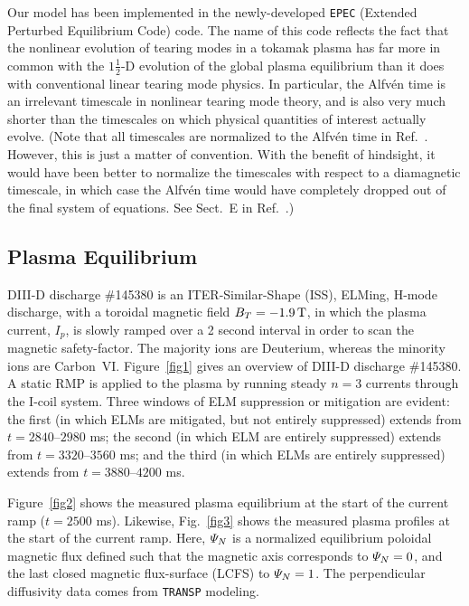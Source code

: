 \documentclass[12pt,prb,aps]{revtex4-1}
\begin{document}
Our model has been implemented in the newly-developed {\tt EPEC} (Extended Perturbed Equilibrium Code) code. The name
of this code reflects the fact that the nonlinear evolution of tearing modes in a
tokamak plasma has far more in common with the $1\tfrac{1}{2}$-D
evolution of the global plasma equilibrium than it does with
conventional linear tearing mode physics. In particular, the Alfv\'{e}n time is
an irrelevant  timescale in nonlinear tearing mode theory, and
is also  very much shorter than the timescales on which
physical quantities of interest actually evolve. (Note that all timescales are normalized to the Alfv\'{e}n time
in Ref.~. However, this is just a matter of convention. With the benefit of hindsight, it would
have been better to normalize the timescales with respect to a diamagnetic timescale, in which case the Alfv\'{e}n time would have completely dropped
out of the final system of equations. See Sect.~E in Ref.~.)

\subsection{Plasma Equilibrium}
DIII-D discharge \#145380 is an ITER-Similar-Shape (ISS), ELMing, H-mode discharge, with a toroidal magnetic field $B_T=-1.9\,{\rm T}$, in which the
plasma current, $I_p$, is slowly ramped over a 2 second interval in order to scan the magnetic safety-factor.\cite{d3d,d3d2} The majority ions are Deuterium, whereas the
minority ions are Carbon~VI.
Figure~\ref{fig1} gives an overview of DIII-D discharge \#145380. 
A static RMP is applied to the plasma by running steady $n=3$ currents through the I-coil system.\cite{icoil}
Three windows of ELM suppression or mitigation are evident: the first (in which ELMs are mitigated, but not
entirely suppressed) extends from $t=2840$--$2980$ ms; the
second (in which ELM are entirely suppressed) extends from $t=3320$--$3560$ ms; and the third (in which ELMs are
entirely suppressed) extends from $t=3880$--$4200$ ms.

Figure~\ref{fig2} shows the measured plasma equilibrium at the start of the current ramp ($t=2500$ ms). Likewise,
Fig.~\ref{fig3} shows the measured plasma profiles at the start of the current ramp. Here, ${\mit\Psi}_N$ is a
normalized equilibrium poloidal magnetic flux defined such that the magnetic axis corresponds to ${\mit\Psi}_N=0$, 
and the last closed magnetic flux-surface (LCFS) to ${\mit\Psi}_N=1$. The perpendicular
diffusivity data comes from {\tt TRANSP} modeling.\cite{transp}  
\end{document}
